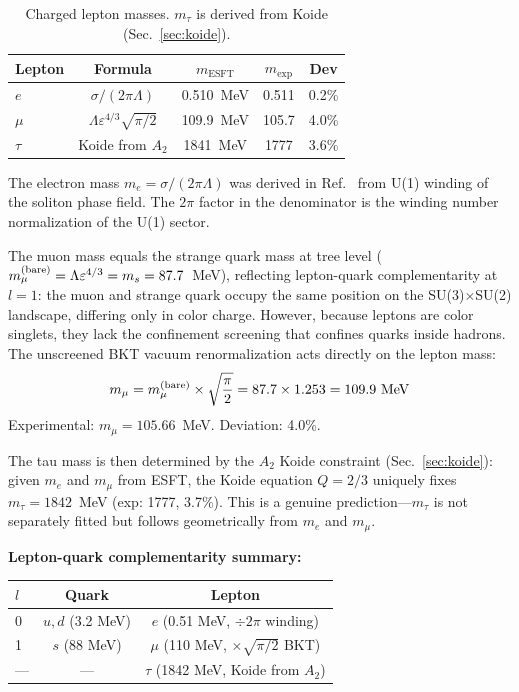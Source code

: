 ﻿\documentclass[twocolumn,preprintnumbers,amsmath,amssymb,prd]{revtex4-2}
\begin{document}
\begin{table}[h]
\caption{Charged lepton masses. $m_\tau$ is derived from Koide (Sec.~\ref{sec:koide}).}
\label{tab:leptons}
\begin{ruledtabular}
\begin{tabular}{lcccc}
Lepton & Formula & $m_{\text{ESFT}}$ & $m_{\text{exp}}$ & Dev \\
\hline
$e$ & $\sigma/(2\pi\Lambda)$ & 0.510~MeV & 0.511 & 0.2\% \\
$\mu$ & $\Lambda\varepsilon^{4/3}\sqrt{\pi/2}$ & 109.9~MeV & 105.7 & 4.0\% \\
$\tau$ & Koide from $A_2$ & 1841~MeV & 1777 & 3.6\% \\
\end{tabular}
\end{ruledtabular}
\end{table}

The electron mass $m_e = \sigma/(2\pi\Lambda)$ was derived in Ref.~\cite{Paper3} from U(1) winding of the soliton phase field. The $2\pi$ factor in the denominator is the winding number normalization of the U(1) sector.

The muon mass equals the strange quark mass at tree level ($m_\mu^{(\rm bare)} = \Lambda\varepsilon^{4/3} = m_s = 87.7$~MeV), reflecting lepton-quark complementarity at $l=1$: the muon and strange quark occupy the same position on the SU(3)$\times$SU(2) landscape, differing only in color charge. However, because leptons are color singlets, they lack the confinement screening that confines quarks inside hadrons. The unscreened BKT vacuum renormalization acts directly on the lepton mass:
\begin{equation}
m_\mu = m_\mu^{(\rm bare)} \times \sqrt{\frac{\pi}{2}} = 87.7 \times 1.253 = 109.9~\text{MeV}
\end{equation}
Experimental: $m_\mu = 105.66$~MeV. Deviation: 4.0\%.

The tau mass is then determined by the $A_2$ Koide constraint (Sec.~\ref{sec:koide}): given $m_e$ and $m_\mu$ from ESFT, the Koide equation $Q = 2/3$ uniquely fixes $m_\tau = 1842$~MeV (exp: 1777, 3.7\%). This is a genuine prediction---$m_\tau$ is not separately fitted but follows geometrically from $m_e$ and $m_\mu$.

\textbf{Lepton-quark complementarity summary:}
\begin{center}
\begin{tabular}{lcc}
$l$ & Quark & Lepton \\ \hline
0 & $u,d$ (3.2 MeV) & $e$ (0.51 MeV, $\div 2\pi$ winding) \\
1 & $s$ (88 MeV) & $\mu$ (110 MeV, $\times\sqrt{\pi/2}$ BKT) \\
--- & --- & $\tau$ (1842 MeV, Koide from $A_2$) \\
\end{tabular}
\end{center}
\end{document}
